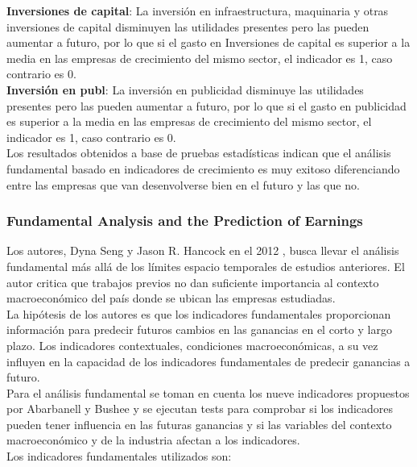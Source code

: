 \textbf{Inversiones de capital}: La inversión en infraestructura, maquinaria y otras inversiones de capital  disminuyen las utilidades presentes pero las pueden aumentar a futuro, por lo que si el gasto en Inversiones de capital es superior a la media en las empresas de crecimiento del mismo sector, el indicador es 1, caso contrario es 0.\\

\textbf{Inversión en publ}: La inversión en publicidad disminuye las utilidades presentes pero las pueden aumentar a futuro, por lo que si el gasto en publicidad es superior a la media en las empresas de crecimiento del mismo sector, el indicador es 1, caso contrario es 0.\\

Los resultados obtenidos a base de pruebas estadísticas indican que el análisis fundamental basado en indicadores de crecimiento es muy exitoso diferenciando entre las empresas que van desenvolverse bien en el futuro y las que no.\\

\subsubsection{Fundamental Analysis and the Prediction of Earnings}

Los autores, Dyna Seng y Jason R. Hancock en el 2012 \cite{DynaSeng2012}, busca llevar el análisis fundamental más allá de los límites espacio temporales de estudios anteriores. El autor critica que trabajos previos no dan suficiente importancia al contexto macroeconómico del país donde se ubican las empresas estudiadas.\\

La hipótesis de los autores es que los indicadores fundamentales proporcionan información para predecir futuros cambios en las ganancias en el corto y largo plazo. Los indicadores contextuales, condiciones macroeconómicas, a su vez influyen en la capacidad de los indicadores fundamentales de predecir ganancias a futuro.\\

Para el an\'alisis fundamental se toman en cuenta los nueve indicadores propuestos por Abarbanell y Bushee \cite{Abarbanell1998} y se ejecutan tests  para comprobar si los indicadores pueden tener influencia en las futuras ganancias y si las variables del contexto macroeconómico y de la industria afectan a los indicadores.\\

Los indicadores fundamentales utilizados son:\\


